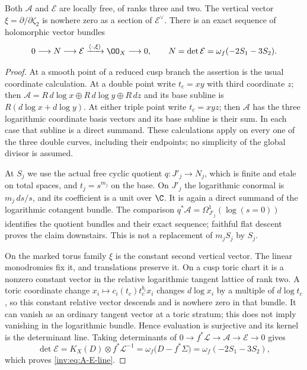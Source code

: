 \begin{proposition}\label{inv:A1.1}
Both $\mathcal A$ and $\mathcal E$ are locally free, of ranks three and
two.  The vertical vector $\xi=\partial/\partial\zeta_2$ is nowhere
zero as a section of $\mathcal E^\vee$.  There is an exact sequence
of holomorphic vector bundles
\begin{equation}\label{inv:eq:A-E-line}
0\longrightarrow N\longrightarrow\mathcal E
 \xrightarrow{\langle\cdot,\xi\rangle}\OO_X\longrightarrow0,
\qquad N=\det\mathcal E=\omega_f(-2S_1-3S_2).
\end{equation}
\end{proposition}
\begin{proof}
At a smooth point of a reduced cusp branch the assertion is the usual
coordinate calculation.  At a double point write $t_c=xy$ with third
coordinate $z$; then
$\mathcal A=R\,d\log x\oplus R\,d\log y\oplus R\,dz$ and its
base subline is $R(d\log x+d\log y)$.  At either triple point write
$t_c=xyz$; then $\mathcal A$ has the three logarithmic coordinate
basis vectors and its base subline is their sum.  In each case that
subline is a direct summand.  These calculations apply on every one
of the three double curves, including their endpoints; no simplicity
of the global divisor is assumed.

At $S_j$ we use the actual free cyclic quotient
$q:J'_j\to N_j$, which is finite and etale on total spaces, and
$t_j=s^{m_j}$ on the base.  On $J'_j$ the logarithmic conormal is
$m_j\,ds/s$, and its coefficient is a unit over $\C$.  It is again a
direct summand of the logarithmic cotangent bundle.  The comparison
$q^*\mathcal A=\Omega_{J'_j}^1(\log(s=0))$ identifies the quotient
bundles and their exact sequence; faithful flat descent proves the
claim downstairs.  This is not a replacement of $m_jS_j$ by $S_j$.

On the marked torus family $\xi$ is the constant second vertical
vector.  The linear monodromies fix it, and translations preserve it.
On a cusp toric chart it is a nonzero constant vector in the relative
logarithmic tangent lattice of rank two.  A toric coordinate change
$x_i\mapsto c_i(t_c)t_c^{b_i}x_i$ changes $d\log x_i$ by a multiple
of $d\log t_c$, so this constant relative vector descends and is
nowhere zero in that bundle.  It can vanish as an ordinary tangent
vector at a toric stratum; this does not imply vanishing in the
logarithmic bundle.  Hence evaluation is surjective and its kernel
is the determinant line.  Taking determinants of
$0\to f^*\mathcal L\to\mathcal A\to\mathcal E\to0$ gives
\[
\det\mathcal E=K_X(D)\otimes f^*\mathcal L^{-1}
=\omega_f\bigl(D-f^*\Sigma\bigr)
=\omega_f(-2S_1-3S_2),
\]
which proves \eqref{inv:eq:A-E-line}.
\end{proof}

